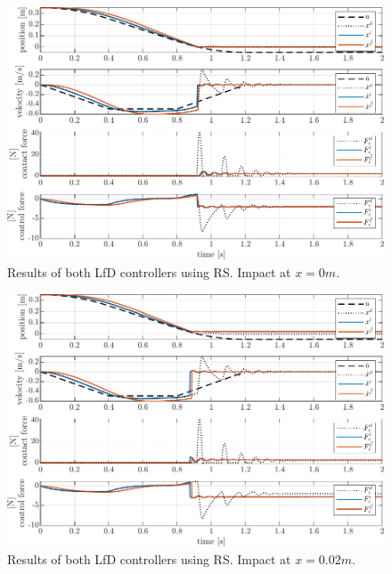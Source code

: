 \documentclass[11pt]{report}
\numberwithin{equation}{section}        %
\numberwithin{figure}{section}          %
\numberwithin{table}{section}           %
\begin{document}
  \begin{figure}[!h]
  \centering
  \begin{adjustwidth}{0pt}{5pt}
  \includegraphics[right]{Graphics/1d_learned_w=0.pdf}
  \end{adjustwidth}
  \caption{Results of both LfD controllers using RS. Impact at $x=0 m.$}
  \label{fig:1d_learned_w0}
  \end{figure}

  \begin{figure}[!h]
  \centering
  \begin{adjustwidth}{0pt}{5pt}
  \includegraphics[right]{Graphics/1d_learned_w=0.02.pdf}
  \end{adjustwidth}
  \caption{Results of both LfD controllers using RS. Impact at $x=0.02 m.$}
  \label{fig:1d_learned_w002}
  \end{figure}
\end{document}
